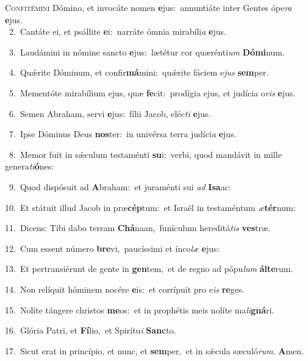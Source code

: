 \lettrine{\initial\textcolor{\initialcolor}{C}}{onfitémini} Dómino, et invocáte nomen \textbf{e}\-jus:~\star annuntiáte inter Gentes ópe\textit{ra} \textbf{e}\-jus.\\
{\numbfont\textcolor{\numbcolor}{~2.}}~Cantáte ei, et psállite \textbf{e}\-i:~\star narráte ómnia mirabíli\textit{a} \textbf{e}\-jus.\par
{\numbfont\textcolor{\numbcolor}{~3.}}~Laudámini in nómine sancto \textbf{e}\-jus:~\star lætétur cor quærénti\textit{um} \textbf{Dó}\-\textbf{mi}num.\par
{\numbfont\textcolor{\numbcolor}{~4.}}~Quǽrite Dóminum, et confir\-\textbf{má}\-mini:~\star quǽrite fáciem e\textit{jus} \textbf{sem}\-per.\par
{\numbfont\textcolor{\numbcolor}{~5.}}~Mementóte mirabílium ejus, quæ \textbf{fe}\-cit:~\star prodígia ejus, et judícia o\textit{ris} \textbf{e}\-jus.\par
{\numbfont\textcolor{\numbcolor}{~6.}}~Semen Abraham, servi \textbf{e}\-jus:~\star fílii Jacob, eléc\textit{ti} \textbf{e}\-jus.\par
{\numbfont\textcolor{\numbcolor}{~7.}}~Ipse Dóminus Deus \textbf{nos}\-ter:~\star in univérsa terra judíci\textit{a} \textbf{e}\-jus.\par
{\numbfont\textcolor{\numbcolor}{~8.}}~Memor fuit in sǽculum testaménti \textbf{su}\-i:~\star verbi, quod mandávit in mille genera\-\textit{ti}\-\textbf{ó}nes:\par
{\numbfont\textcolor{\numbcolor}{~9.}}~Quod dispósuit ad \textbf{A}\-braham:~\star et juraménti sui \textit{ad} \textbf{I}\-\textbf{sa}ac:\par
{\numbfont\textcolor{\numbcolor}{10.}}~Et státuit illud Jacob in præ\-\textbf{cép}\-tum:~\star et Israël in testaméntum \textit{æ}\-\textbf{tér}num:\par
{\numbfont\textcolor{\numbcolor}{11.}}~Dicens: Tibi dabo terram \textbf{Chá}\-naan,~\star funículum hereditá\textit{tis} \textbf{ves}\-træ.\par
{\numbfont\textcolor{\numbcolor}{12.}}~Cum essent número \textbf{bre}\-vi,~\star paucíssimi et ínco\textit{læ} \textbf{e}\-jus:\par
{\numbfont\textcolor{\numbcolor}{13.}}~Et pertransiérunt de gente in \textbf{gen}\-tem,~\star et de regno ad pópu\textit{lum} \textbf{ál}\-\textbf{te}rum.\par
{\numbfont\textcolor{\numbcolor}{14.}}~Non relíquit hóminem nocére \textbf{e}\-is:~\star et corrípuit pro e\textit{is} \textbf{re}\-ges.\par
{\numbfont\textcolor{\numbcolor}{15.}}~Nolíte tángere christos \textbf{me}\-os:~\star et in prophétis meis nolíte ma\-\textit{li}\-\textbf{gná}ri.\par
{\numbfont\textcolor{\numbcolor}{16.}}~Glória Patri, et \textbf{Fí}\-lio,~\star et Spirítu\textit{i} \textbf{Sanc}\-to.\par
{\numbfont\textcolor{\numbcolor}{17.}}~Sicut erat in princípio, et nunc, et \textbf{sem}\-per,~\star et in sǽcula sæculó\-\textit{rum}\-. \textbf{A}\-men.\par
